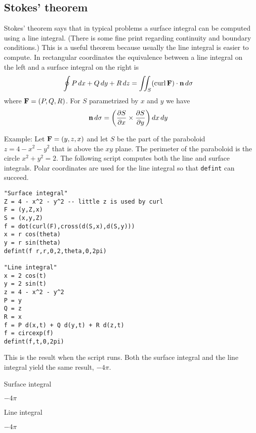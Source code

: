 \subsection{Stokes' theorem}

Stokes' theorem says that in typical problems a surface integral can be
computed using a line integral.
(There is some fine print regarding continuity and boundary conditions.)
This is a useful theorem because usually the line integral is easier to
compute.
In rectangular coordinates the equivalence between a line integral
on the left and a surface integral on the right is
%
$$\oint P\,dx+Q\,dy+R\,dz
=\int\!\!\!\int_S(\mathop{\rm curl}{\bf F})\cdot{\bf n}\,d\sigma
$$
%
where ${\bf F}=(P,Q,R)$.
For $S$ parametrized by $x$ and $y$ we have
$${\bf n}\,d\sigma=\left(
\frac{\partial S}{\partial x}\times\frac{\partial S}{\partial y}
\right)dx\,dy$$

\noindent
Example:
Let ${\bf F}=(y,z,x)$ and let $S$ be the part of the paraboloid
$z=4-x^2-y^2$
that is above the $xy$ plane.
The perimeter of the paraboloid is the circle $x^2+y^2=2$.
The following script computes both the line and surface integrals.
Polar coordinates are used for the line integral so that \verb$defint$ can succeed.

{\color{blue}
\begin{verbatim}
"Surface integral"
Z = 4 - x^2 - y^2 -- little z is used by curl
F = (y,Z,x)
S = (x,y,Z)
f = dot(curl(F),cross(d(S,x),d(S,y)))
x = r cos(theta)
y = r sin(theta)
defint(f r,r,0,2,theta,0,2pi)

"Line integral"
x = 2 cos(t)
y = 2 sin(t)
z = 4 - x^2 - y^2
P = y
Q = z
R = x
f = P d(x,t) + Q d(y,t) + R d(z,t)
f = circexp(f)
defint(f,t,0,2pi)
\end{verbatim}
}

\noindent
This is the result when the script runs.
Both the surface integral and the line integral
yield the same result, $-4\pi$.

\bigskip
\noindent
Surface integral

\noindent
$\displaystyle -4\pi$

\noindent
Line integral

\noindent
$\displaystyle -4\pi$
